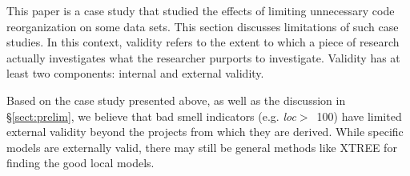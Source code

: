 \documentclass[twocolumn,5p]{elsarticle}
\newcommand{\tion}[1]{\S\ref{sect:#1}}
\theoremstyle{break}
\begin{document}
\begin{itemize}
This paper is a case study that studied the effects of  limiting unnecessary code reorganization on some data sets. This section discusses limitations of such case studies. In this context, validity refers to the extent to which a piece of research actually
investigates what the researcher purports to investigate.
Validity has at least two components: internal and
external validity.




		

Based on the case study presented above,
as well as the discussion in \tion{prelim},
we believe that bad smell indicators (e.g. \mbox{{\em loc}$>$ 100})
have limited external validity beyond the projects from which they are derived. 
While specific models are externally valid,
there may still be general methods like XTREE for finding the good local models.  


\end{itemize}
\end{document}
